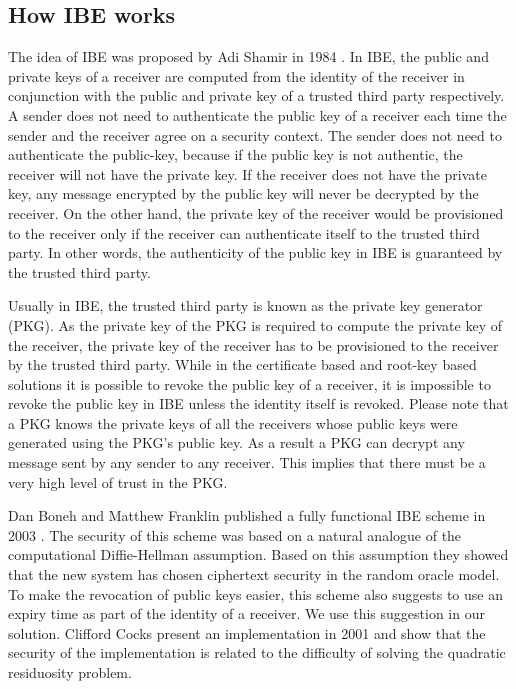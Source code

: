 \documentclass[runningheads,a4paper]{llncs} %
\begin{document}
\subsection{How IBE works}
The idea of IBE was proposed by Adi Shamir in 1984 \cite{IBE_shamir}. In IBE, the public and private keys of a receiver are computed from the identity of the receiver in conjunction with the public and private key of a trusted third party respectively. A sender does not need to authenticate the public key of a receiver each time the sender and the receiver agree on a security context. The sender does not need to authenticate the public-key, because if the public key is not authentic, the receiver will not have the private key. If the receiver does not have the private key, any message encrypted by the public key will never be decrypted by the receiver. On the other hand, the private key of the receiver would be provisioned to the receiver only if the receiver can authenticate itself to the trusted third party. In other words, the authenticity of the public key in IBE is guaranteed by the trusted third party. 

Usually in IBE, the trusted third party is known as the private key generator (PKG). As the private key of the PKG is required to compute the private key of the receiver, the private key of the receiver has to be provisioned to the receiver by the trusted third party. While in the certificate based and root-key based solutions it is possible to revoke the public key of a receiver, it is impossible to revoke the public key in IBE unless the identity itself is revoked. Please note that a PKG knows the private keys of all the receivers whose public keys were generated using the PKG's public key. As a result a PKG can decrypt any message sent by any sender to any receiver. This implies that there must be a very high level of trust in the PKG.

Dan Boneh and Matthew Franklin published a fully functional IBE scheme in 2003 \cite{IBE_boneh_franklin}. The security of this
scheme was based on a natural analogue of the computational Diffie-Hellman assumption. Based on this assumption they showed that the new system has chosen ciphertext security in the random oracle model. To make the revocation of public keys easier, this scheme also suggests to use an expiry time as part of the identity of a receiver. We use this suggestion in our solution. Clifford Cocks present an implementation in 2001 \cite{IBE_clifford} and show that the security of the implementation is related to the difficulty of solving the quadratic residuosity problem.
\end{document}
